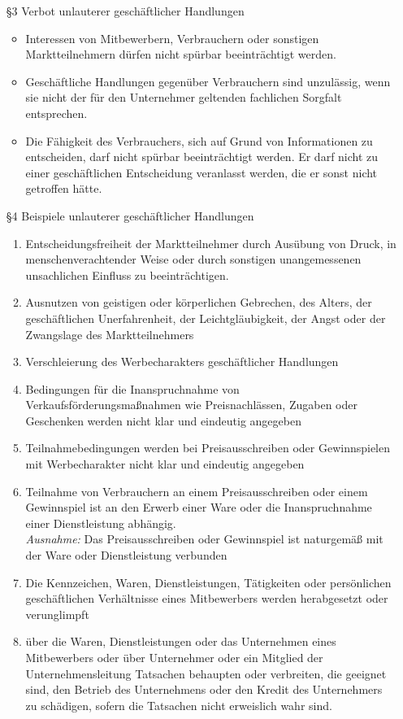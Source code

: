 \begin{itemize}
	\item[§3] Verbot unlauterer geschäftlicher Handlungen
			\begin{itemize}
				\item Interessen von Mitbewerbern, Verbrauchern oder sonstigen Marktteilnehmern dürfen nicht spürbar beeinträchtigt werden.
				\item Geschäftliche Handlungen gegenüber Verbrauchern sind unzulässig, wenn sie nicht der für den Unternehmer geltenden fachlichen Sorgfalt entsprechen.
				\item Die Fähigkeit des Verbrauchers, sich auf Grund von Informationen zu entscheiden, darf nicht spürbar beeinträchtigt werden. Er darf nicht zu einer geschäftlichen Entscheidung veranlasst werden, die er sonst nicht getroffen hätte.
			\end{itemize}
	\item[§4] Beispiele unlauterer geschäftlicher Handlungen
			\begin{enumerate}
				\item Entscheidungsfreiheit der Marktteilnehmer durch Ausübung von Druck, in menschenverachtender Weise oder durch sonstigen unangemessenen unsachlichen Einfluss zu beeinträchtigen.
				\item Ausnutzen von geistigen oder körperlichen Gebrechen, des Alters, der geschäftlichen Unerfahrenheit, der Leichtgläubigkeit, der Angst oder der Zwangslage des Marktteilnehmers
				\item Verschleierung des Werbecharakters geschäftlicher Handlungen
				\item Bedingungen für die Inanspruchnahme von Verkaufsförderungsmaßnahmen wie Preisnachlässen, Zugaben oder Geschenken werden nicht klar und eindeutig angegeben
				\item Teilnahmebedingungen werden bei Preisausschreiben oder Gewinnspielen mit Werbecharakter nicht klar und eindeutig angegeben
				\item Teilnahme von Verbrauchern an einem Preisausschreiben oder einem Gewinnspiel ist an den Erwerb einer Ware oder die Inanspruchnahme einer Dienstleistung abhängig. \\
{\it Ausnahme:} Das Preisausschreiben oder Gewinnspiel ist naturgemäß mit der Ware oder Dienstleistung verbunden
				\item Die Kennzeichen, Waren, Dienstleistungen, Tätigkeiten oder persönlichen geschäftlichen Verhältnisse eines Mitbewerbers werden herabgesetzt oder verunglimpft			
				\item über die Waren, Dienstleistungen oder das Unternehmen eines Mitbewerbers oder über Unternehmer oder ein Mitglied der Unternehmensleitung Tatsachen behaupten oder verbreiten, die geeignet sind, den Betrieb des Unternehmens oder den Kredit des Unternehmers zu schädigen, sofern die Tatsachen nicht erweislich wahr sind.

\end{enumerate}
\end{itemize}
